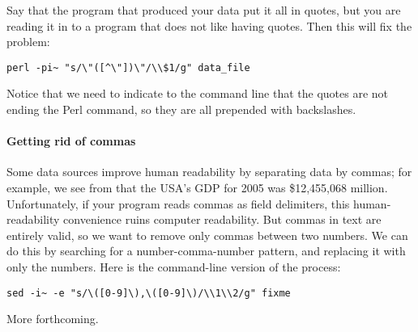 Say that the program that produced your data put it all in
quotes, but you are reading it in to a  program that does not like
having quotes. Then this will fix the problem:
\begin{lstlisting}
perl -pi~ "s/\"([^\"])\"/\\$1/g" data_file
\end{lstlisting}
Notice that we need to indicate to the command line that the quotes are
not ending the Perl command, so they are all prepended with backslashes.

\paragraph{Getting rid of commas}
Some data sources improve human readability by separating data by
commas; for example, we see from  that the USA's GDP for
2005 was \$12,455,068 million. Unfortunately, if your program reads
commas as field delimiters, this human-readability convenience ruins
computer readability. But commas in text are entirely valid, so we want
to remove only commas between two numbers. We can do this by searching
for a number-comma-number pattern, and replacing it with only the
numbers. Here is the  command-line version of the process:
\begin{lstlisting}
sed -i~ -e "s/\([0-9]\),\([0-9]\)/\\1\\2/g" fixme
\end{lstlisting}


More forthcoming.



